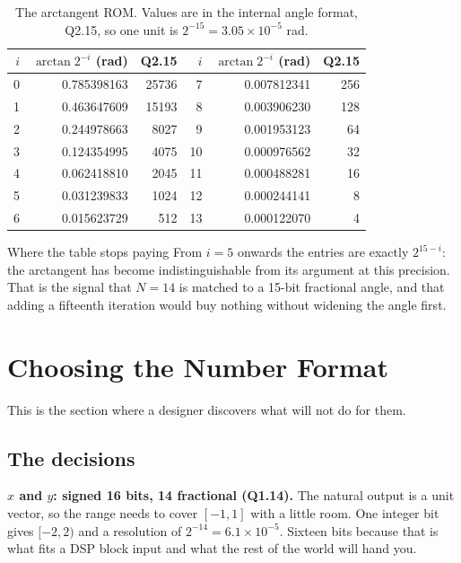 \begin{table}[htbp]
  \centering
  \small
  \caption{The arctangent ROM. Values are in the internal angle format,
  Q2.15, so one unit is $2^{-15} = 3.05\times10^{-5}$ rad.}
  \label{tab:case:atan}
  \begin{tabular}{@{}rrr@{\hspace{2.5em}}rrr@{}}
    \toprule
    $i$ & $\arctan 2^{-i}$ (rad) & Q2.15 &
    $i$ & $\arctan 2^{-i}$ (rad) & Q2.15\\
    \midrule
     0 & 0.785398163 & 25736 &  7 & 0.007812341 &  256\\
     1 & 0.463647609 & 15193 &  8 & 0.003906230 &  128\\
     2 & 0.244978663 &  8027 &  9 & 0.001953123 &   64\\
     3 & 0.124354995 &  4075 & 10 & 0.000976562 &   32\\
     4 & 0.062418810 &  2045 & 11 & 0.000488281 &   16\\
     5 & 0.031239833 &  1024 & 12 & 0.000244141 &    8\\
     6 & 0.015623729 &   512 & 13 & 0.000122070 &    4\\
    \bottomrule
  \end{tabular}
\end{table}

\begin{notebox}{Where the table stops paying}
From $i = 5$ onwards the entries are exactly $2^{15-i}$: the arctangent has
become indistinguishable from its argument at this precision. That is the
signal that $N = 14$ is matched to a 15-bit fractional angle, and that adding
a fifteenth iteration would buy nothing without widening the angle first.
\end{notebox}

\section{Choosing the Number Format}
\label{sec:case:format}

This is the section where a \VHDL{} designer discovers what \SV{} will not do
for them.

\subsection{The decisions}

\textbf{$x$ and $y$: signed 16 bits, 14 fractional (Q1.14).} The natural
output is a unit vector, so the range needs to cover $[-1, 1]$ with a little
room. One integer bit gives $[-2, 2)$ and a resolution of
$2^{-14} = 6.1\times10^{-5}$. Sixteen bits because that is what fits a
DSP block input and what the rest of the world will hand you.


